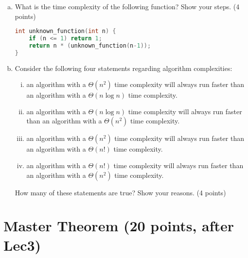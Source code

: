 \documentclass[11pt]{exam}
\begin{document}
\begin{enumerate}[(a)]
\item What is the time complexity of the following function? Show your steps. (4 points)
\begin{lstlisting}[language=c++]
int unknown_function(int n) {
	if (n <= 1) return 1;
	return n * (unknown_function(n-1));
}
\end{lstlisting}
\begin{solution}
\end{solution}

\item Consider the following four statements regarding algorithm complexities:
\begin{enumerate}[i)]
\item an algorithm with a $\Theta(n^2)$ time complexity will always run faster than an algorithm with a $\Theta(n \log n)$ time complexity.
\item an algorithm with a $\Theta(n \log n)$ time complexity will always run faster than an algorithm with a $\Theta(n^2)$ time complexity.
\item an algorithm with a $\Theta(n^2)$ time complexity will always run faster than an algorithm with a $\Theta(n!)$ time complexity.
\item an algorithm with a $\Theta(n!)$ time complexity will always run faster than an algorithm with a $\Theta(n^2)$ time complexity.
\end{enumerate}

How many of these statements are true? Show your reasons. (4 points)
\begin{solution}
\end{solution}

\end{enumerate}
\newpage
\section{Master Theorem (20 points, after Lec3)}
\end{document}
